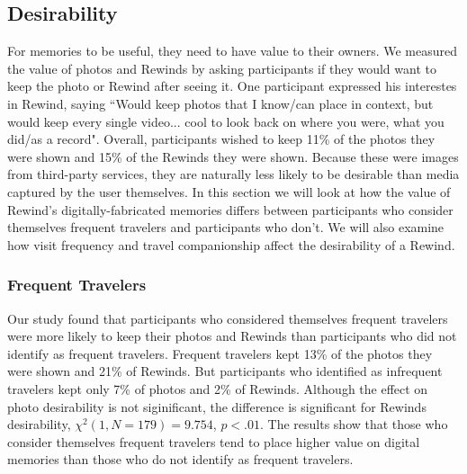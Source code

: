 \documentclass{sigchi}
\begin{document}

\subsection{Desirability}
For memories to be useful, they need to have value to their owners. We measured the value of photos and Rewinds by asking participants if they would want to keep the photo or Rewind after seeing it. One participant expressed his interestes in Rewind, saying ``Would keep photos that I know/can place in context, but would keep every single video... cool to look back on where you were, what you did/as a record". Overall, participants wished to keep 11\% of the photos they were shown and 15\% of the Rewinds they were shown. Because these were images from third-party services, they are naturally less likely to be desirable than media captured by the user themselves. In this section we will look at how the value of Rewind's digitally-fabricated memories differs between participants who consider themselves frequent travelers and participants who don't. We will also examine how visit frequency and travel companionship affect the desirability of a Rewind.


\subsubsection{Frequent Travelers}
Our study found that participants who considered themselves frequent travelers were more likely to keep their photos and Rewinds than participants who did not identify as frequent travelers. Frequent travelers kept 13\% of the photos they were shown and 21\% of Rewinds. But participants who identified as infrequent travelers kept only 7\% of photos and 2\% of Rewinds. Although the effect on photo desirability is not siginificant, the difference is significant for Rewinds desirability, $\chi^2(1, N=179) = 9.754$, $p <.01$. The results show that those who consider themselves frequent travelers tend to place higher value on digital memories than those who do not identify as frequent travelers.
\end{document}
